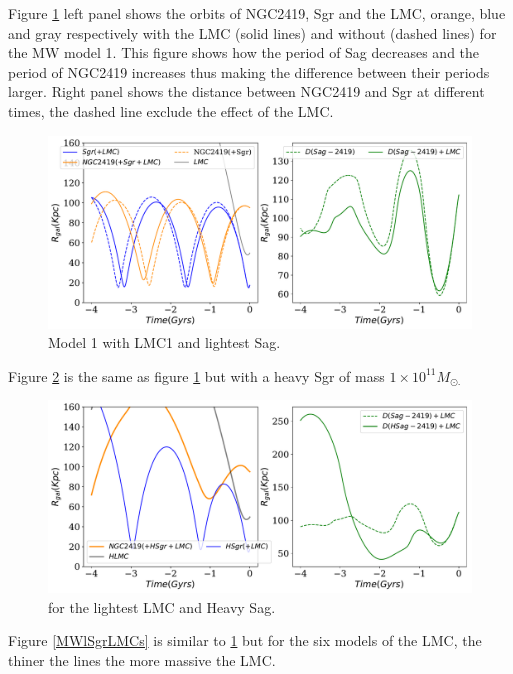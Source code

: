 \documentclass[14pt]{article}
\begin{document}
Figure \ref{fig:MWlSgrl} left panel shows the orbits of NGC2419, Sgr and the LMC,
orange, blue and gray respectively with the
LMC (solid lines) and without (dashed lines) for the MW model 1. This figure shows how
the period of Sag decreases and the period of NGC2419 increases thus making
the difference between their periods larger. Right panel shows the
distance between NGC2419 and Sgr at different times, the dashed line
exclude the effect of the LMC.

\begin{figure}[H]
\centering
\includegraphics[scale=0.5]{../exploratory_code/NGC2419_sphMWSGRLMC.pdf}
\caption{Model 1 with LMC1 and lightest Sag.\label{fig:MWlSgrl}}
\end{figure}

Figure \ref{fig:MWlSgrh} is the same as figure \ref{fig:MWlSgrl} but
with a heavy Sgr of mass $1\times 10^{11}M_{\odot.}$

\begin{figure}[H]
\centering
\includegraphics[scale=0.5]{../exploratory_code/NGC2419_sphMWHSGRLMC.pdf}
\caption{for the lightest LMC and Heavy Sag.\label{fig:MWlSgrh}}
\end{figure}

Figure \ref{MWlSgrLMCs} is similar to \ref{fig:MWlSgrl} but for the
six models of the LMC, the thiner the lines the more massive the LMC.
\end{document}
